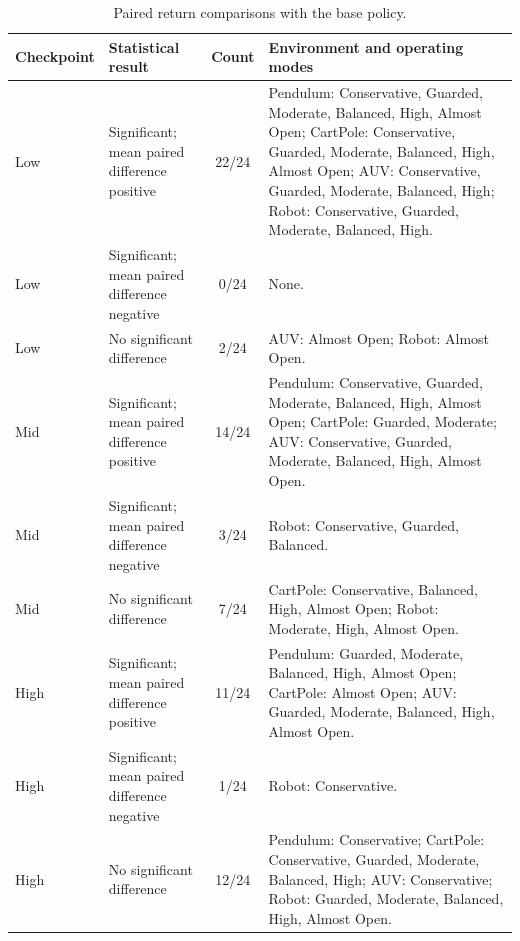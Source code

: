 \begin{table}[t]
  \centering
  \caption{Paired return comparisons with the base policy.}
  \label{tab:comparisons_with_base}
  \scriptsize
  \begin{tabularx}{\columnwidth}{llcX}
    \toprule
    Checkpoint & Statistical result & Count & Environment and operating modes \\
    \midrule
    Low & Significant; mean paired difference positive & 22/24 & Pendulum: Conservative, Guarded, Moderate, Balanced, High, Almost Open; CartPole: Conservative, Guarded, Moderate, Balanced, High, Almost Open; AUV: Conservative, Guarded, Moderate, Balanced, High; Robot: Conservative, Guarded, Moderate, Balanced, High. \\
    Low & Significant; mean paired difference negative & 0/24 & None. \\
    Low & No significant difference & 2/24 & AUV: Almost Open; Robot: Almost Open. \\
    \midrule
    Mid & Significant; mean paired difference positive & 14/24 & Pendulum: Conservative, Guarded, Moderate, Balanced, High, Almost Open; CartPole: Guarded, Moderate; AUV: Conservative, Guarded, Moderate, Balanced, High, Almost Open. \\
    Mid & Significant; mean paired difference negative & 3/24 & Robot: Conservative, Guarded, Balanced. \\
    Mid & No significant difference & 7/24 & CartPole: Conservative, Balanced, High, Almost Open; Robot: Moderate, High, Almost Open. \\
    \midrule
    High & Significant; mean paired difference positive & 11/24 & Pendulum: Guarded, Moderate, Balanced, High, Almost Open; CartPole: Almost Open; AUV: Guarded, Moderate, Balanced, High, Almost Open. \\
    High & Significant; mean paired difference negative & 1/24 & Robot: Conservative. \\
    High & No significant difference & 12/24 & Pendulum: Conservative; CartPole: Conservative, Guarded, Moderate, Balanced, High; AUV: Conservative; Robot: Guarded, Moderate, Balanced, High, Almost Open. \\
    \bottomrule
  \end{tabularx}
\end{table}

